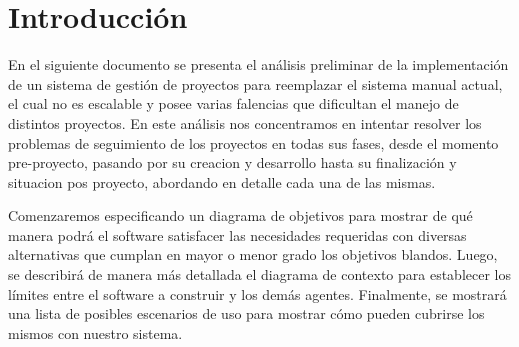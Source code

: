 \section{Introducción}
En el siguiente documento se presenta el análisis preliminar de la implementación de un sistema de gestión de proyectos para reemplazar el sistema manual actual, 
el cual no es escalable y posee varias falencias que dificultan el manejo de distintos proyectos. 
En este análisis nos concentramos en intentar resolver los problemas de seguimiento de los proyectos en todas sus fases, 
desde el momento pre-proyecto, pasando por su creacion y desarrollo hasta su finalización y situacion pos proyecto, abordando en detalle cada una de las mismas.

Comenzaremos especificando un diagrama de objetivos para mostrar de qué manera podrá el software satisfacer las necesidades requeridas con diversas alternativas que cumplan en mayor o menor grado los objetivos blandos. Luego, se describirá de manera más detallada el diagrama de contexto para establecer los límites entre el software a construir y los demás agentes. Finalmente, se mostrará una lista de posibles escenarios de uso para mostrar cómo pueden cubrirse los mismos con nuestro sistema.
